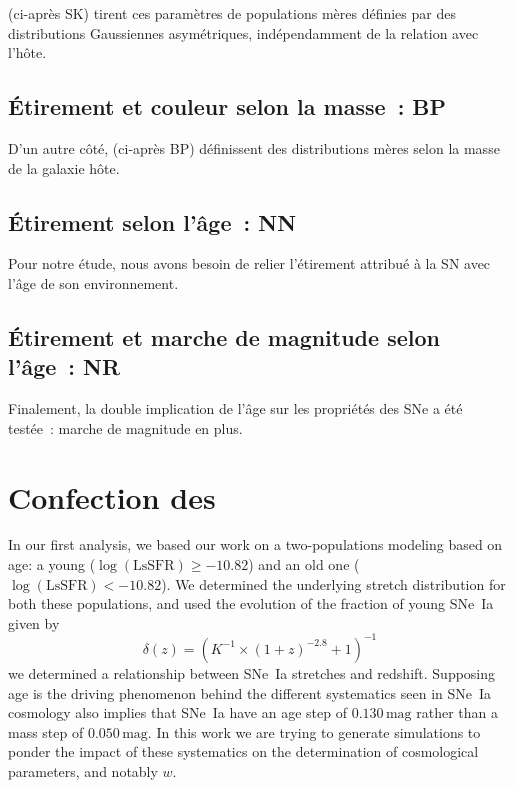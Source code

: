 \documentclass[../main/main.tex]{subfiles}
\begin{document}
\cite{scolnic2016} (ci-après SK) tirent ces paramètres de populations
mères définies par des distributions Gaussiennes asymétriques, indépendamment de
la relation avec l'hôte.

\subsection{Étirement et couleur selon la masse~: BP}\label{ssec:bp}

D'un autre côté, \cite{popovic2021a} (ci-après BP)
définissent des distributions mères selon la masse de la galaxie hôte.

\subsection{Étirement selon l'âge~: NN}\label{ssec:nn}

Pour notre étude, nous avons besoin de relier l'étirement attribué à la SN avec
l'âge de son environnement. 

\subsection{Étirement et marche de magnitude selon l'âge~: NR}\label{ssec:nr}

Finalement, la double implication de l'âge sur les propriétés des SNe a été
testée~: marche de magnitude en plus.

\section{Confection des \hostlib}\label{sec:hmake}

In our first analysis, we based our work on a two-populations modeling based on
age: a young ($\log(\mathrm{LsSFR}) \geq -10.82$) and an old one
($\log(\mathrm{LsSFR}) < -10.82$). We determined the underlying stretch
distribution for both these populations, and used the evolution of the fraction
of young SNe~Ia given by
\begin{equation}\label{eq:delta}
    \delta(z) = \left(K^{-1}\times\left(1+z\right)^{-2.8}+1\right)^{-1} 
\end{equation}
we determined a relationship between SNe~Ia stretches and redshift. Supposing
age is the driving phenomenon behind the different systematics seen in SNe~Ia
cosmology also implies that SNe~Ia have an age step of $0.130\,\mathrm{mag}$
rather than a mass step of $0.050\,\mathrm{mag}$. In this work we are trying to
generate simulations to ponder the impact of these systematics on the
determination of cosmological parameters, and notably $w$.
\end{document}
